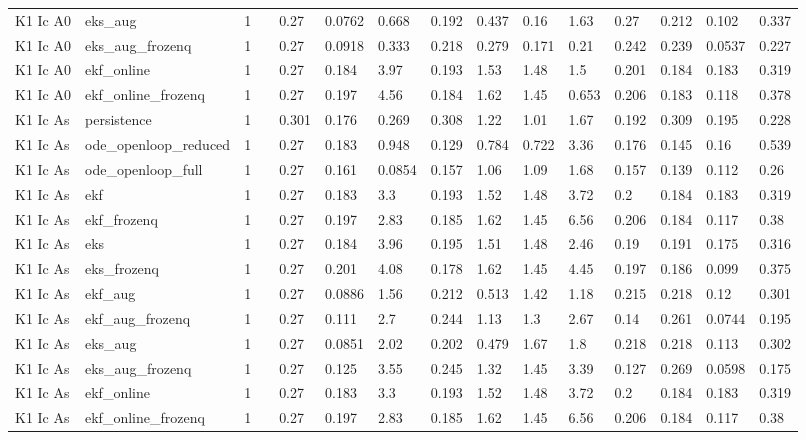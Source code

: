 \begin{table}[t]
\begin{tabular}{lllllllllllllll}
K1 Ic A0 & eks\_aug & 1 &  & 0.27 & 0.0762 & 0.668 & 0.192 & 0.437 & 0.16 & 1.63 & 0.27 & 0.212 & 0.102 & 0.337 \\
K1 Ic A0 & eks\_aug\_frozenq & 1 &  & 0.27 & 0.0918 & 0.333 & 0.218 & 0.279 & 0.171 & 0.21 & 0.242 & 0.239 & 0.0537 & 0.227 \\
K1 Ic A0 & ekf\_online & 1 &  & 0.27 & 0.184 & 3.97 & 0.193 & 1.53 & 1.48 & 1.5 & 0.201 & 0.184 & 0.183 & 0.319 \\
K1 Ic A0 & ekf\_online\_frozenq & 1 &  & 0.27 & 0.197 & 4.56 & 0.184 & 1.62 & 1.45 & 0.653 & 0.206 & 0.183 & 0.118 & 0.378 \\
K1 Ic As & persistence & 1 &  & 0.301 & 0.176 & 0.269 & 0.308 & 1.22 & 1.01 & 1.67 & 0.192 & 0.309 & 0.195 & 0.228 \\
K1 Ic As & ode\_openloop\_reduced & 1 &  & 0.27 & 0.183 & 0.948 & 0.129 & 0.784 & 0.722 & 3.36 & 0.176 & 0.145 & 0.16 & 0.539 \\
K1 Ic As & ode\_openloop\_full & 1 &  & 0.27 & 0.161 & 0.0854 & 0.157 & 1.06 & 1.09 & 1.68 & 0.157 & 0.139 & 0.112 & 0.26 \\
K1 Ic As & ekf & 1 &  & 0.27 & 0.183 & 3.3 & 0.193 & 1.52 & 1.48 & 3.72 & 0.2 & 0.184 & 0.183 & 0.319 \\
K1 Ic As & ekf\_frozenq & 1 &  & 0.27 & 0.197 & 2.83 & 0.185 & 1.62 & 1.45 & 6.56 & 0.206 & 0.184 & 0.117 & 0.38 \\
K1 Ic As & eks & 1 &  & 0.27 & 0.184 & 3.96 & 0.195 & 1.51 & 1.48 & 2.46 & 0.19 & 0.191 & 0.175 & 0.316 \\
K1 Ic As & eks\_frozenq & 1 &  & 0.27 & 0.201 & 4.08 & 0.178 & 1.62 & 1.45 & 4.45 & 0.197 & 0.186 & 0.099 & 0.375 \\
K1 Ic As & ekf\_aug & 1 &  & 0.27 & 0.0886 & 1.56 & 0.212 & 0.513 & 1.42 & 1.18 & 0.215 & 0.218 & 0.12 & 0.301 \\
K1 Ic As & ekf\_aug\_frozenq & 1 &  & 0.27 & 0.111 & 2.7 & 0.244 & 1.13 & 1.3 & 2.67 & 0.14 & 0.261 & 0.0744 & 0.195 \\
K1 Ic As & eks\_aug & 1 &  & 0.27 & 0.0851 & 2.02 & 0.202 & 0.479 & 1.67 & 1.8 & 0.218 & 0.218 & 0.113 & 0.302 \\
K1 Ic As & eks\_aug\_frozenq & 1 &  & 0.27 & 0.125 & 3.55 & 0.245 & 1.32 & 1.45 & 3.39 & 0.127 & 0.269 & 0.0598 & 0.175 \\
K1 Ic As & ekf\_online & 1 &  & 0.27 & 0.183 & 3.3 & 0.193 & 1.52 & 1.48 & 3.72 & 0.2 & 0.184 & 0.183 & 0.319 \\
K1 Ic As & ekf\_online\_frozenq & 1 &  & 0.27 & 0.197 & 2.83 & 0.185 & 1.62 & 1.45 & 6.56 & 0.206 & 0.184 & 0.117 & 0.38 \\

\end{tabular}
\end{table}
